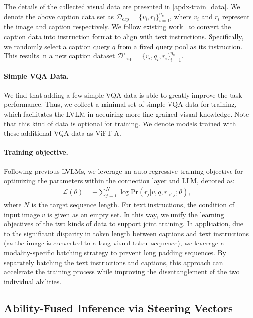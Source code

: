 The details of the collected visual data are presented in \autoref{apdx-train_data}. 
We denote the above caption data set as $\mathcal{D}_{\text{cap}} = \{v_i, r_i\}_{i=1}^{n_c}$, where $v_i$ and $r_i$ represent the image and caption respectively. We follow existing work~\cite{liu2024visual} to convert the caption data into instruction format to align with text instructions.
Specifically, we randomly select a caption query $q$ from a fixed query pool as its instruction. This results in a new caption dataset $\mathcal{D'}_{\text{cap}} = \{v_i, q_i, r_i\}_{i=1}^{n_c}$.

\paragraph{Simple VQA Data.} 
We find that adding a few simple VQA data is able to greatly improve the task performance. 
Thus, we collect a minimal set of simple VQA data for training,  which facilitates the LVLM in acquiring more fine-grained visual knowledge. 
Note that this kind of data is optional for training. We denote models trained with these additional VQA data as ViFT-A.

\paragraph{Training objective.} 
Following previous LVLMs, we leverage an auto-regressive training objective for optimizing the parameters within the connection layer and LLM, denoted as:
\begin{align}
    \mathcal{L}(\theta) = - \sum_{j=1}^N \log \text{Pr}(r_j|v,q,r_{<j};\theta),
\end{align}
where $N$ is the target sequence length.
For text instructions, the condition of input image $v$ is given as an empty set. 
In this way, we unify the learning objectives of the two kinds of data to support joint training.
In application, due to the significant disparity in token length between captions and text instructions (as the image is converted to a long visual token sequence), we leverage a modality-specific batching strategy to prevent long padding sequences.
By separately batching the text instructions and captions, this approach can accelerate the training process while improving the disentanglement of the two individual abilities.


\subsection{Ability-Fused Inference via Steering Vectors} 

